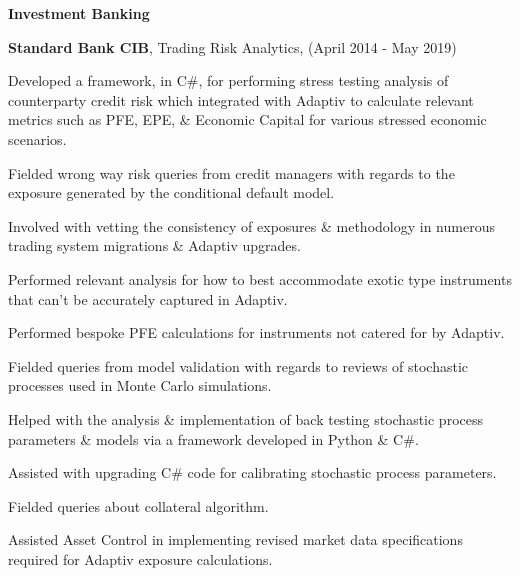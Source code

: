 \documentclass[11pt]{article}
\newenvironment{outerlist}[1][\enskip\textbullet]%
        {\begin{itemize}[#1]}{\end{itemize}%
         \vspace{-.6\baselineskip}}
\newenvironment{innerlist}[1][\enskip\textbullet]%
        {\begin{compactitem}[#1]}{\end{compactitem}}
\begin{document}
\textbf{Investment Banking}

\begin{outerlist}
	\item[] \textbf{\textcolor{customaqua}{Standard Bank CIB}}, Trading Risk Analytics, (April 2014 - May 2019)
	\begin{innerlist}
		\item Developed a framework, in C\#, for performing stress testing analysis of counterparty credit risk which integrated with Adaptiv to calculate relevant metrics such as PFE, EPE, \& Economic Capital for various stressed economic scenarios.
						\item Fielded wrong way risk queries from credit managers with regards to the exposure generated by the conditional default model.
						\item Involved with vetting the consistency of exposures \& methodology in numerous trading system migrations \& Adaptiv upgrades.
						\item Performed relevant analysis for how to best accommodate exotic type instruments that can't be accurately captured in Adaptiv.
						\item Performed bespoke PFE calculations for instruments not catered for by Adaptiv.
						\item Fielded queries from model validation with regards to reviews of stochastic processes used in Monte Carlo simulations.
						\item Helped with the analysis \& implementation of back testing stochastic process parameters \& models via a framework developed in Python \& C\#.
						\item Assisted with upgrading C\# code for calibrating stochastic process parameters. 
						\item Fielded queries about collateral algorithm.
						\item Assisted Asset Control in implementing revised market data specifications required for Adaptiv exposure calculations.
					\end{innerlist}
					

\end{outerlist}
\end{document}
